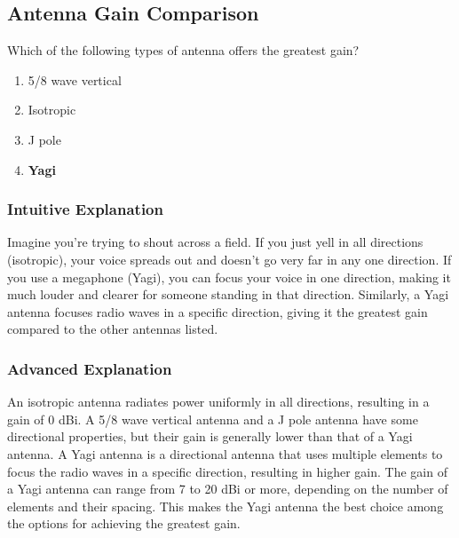 \subsection{Antenna Gain Comparison}
\label{T9A06}

\begin{tcolorbox}[colback=gray!10!white,colframe=black!75!black,title=T9A06]
Which of the following types of antenna offers the greatest gain?
\begin{enumerate}[noitemsep]
    \item 5/8 wave vertical
    \item Isotropic
    \item J pole
    \item \textbf{Yagi}
\end{enumerate}
\end{tcolorbox}

\subsubsection*{Intuitive Explanation}
Imagine you're trying to shout across a field. If you just yell in all directions (isotropic), your voice spreads out and doesn't go very far in any one direction. If you use a megaphone (Yagi), you can focus your voice in one direction, making it much louder and clearer for someone standing in that direction. Similarly, a Yagi antenna focuses radio waves in a specific direction, giving it the greatest gain compared to the other antennas listed.

\subsubsection*{Advanced Explanation}
An isotropic antenna radiates power uniformly in all directions, resulting in a gain of 0 dBi. A 5/8 wave vertical antenna and a J pole antenna have some directional properties, but their gain is generally lower than that of a Yagi antenna. A Yagi antenna is a directional antenna that uses multiple elements to focus the radio waves in a specific direction, resulting in higher gain. The gain of a Yagi antenna can range from 7 to 20 dBi or more, depending on the number of elements and their spacing. This makes the Yagi antenna the best choice among the options for achieving the greatest gain.